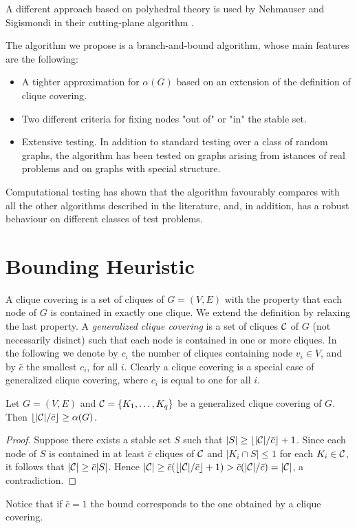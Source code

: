 A different approach based on polyhedral theory is used by Nehmauser
and Sigismondi in their cutting-plane algorithm  \cite{NeSi89}.

   The algorithm we propose is a branch-and-bound algorithm, whose
main features are the following: 

\begin{itemize}
\item A tighter  approximation for $\alpha(G)$ based on an extension
of the definition of clique covering. 
\item Two different criteria for fixing nodes "out of" or "in" the
stable set. 
 \item Extensive testing. In addition to standard testing over a
class  of random graphs, the algorithm has been tested on graphs 
arising from istances of real problems and on graphs with
special  structure. 
\end{itemize} 

Computational testing has shown that the algorithm favourably
compares with all the other algorithms described in the
literature, and, in addition, has a robust behaviour on different
classes of test problems. 



\section{Bounding Heuristic}
\label{Se-Bounding}

A  clique covering is a set of cliques of $G=(V,E)$ with
the property that each node of $G$ is contained in exactly one
clique. We extend the definition by relaxing the last property. 
 A {\it generalized clique covering} is a set of
cliques $\cal C$ of $G$ (not necessarily disinct) such that each
node is contained in one or more cliques. In the following we denote
by $c_i$ the number of cliques containing node $v_i \in V$, and by
$\bar c$ the smallest $c_i$, for all $i$. 
   Clearly a   clique covering is a special case of 
generalized clique covering, where $c_i$ is equal to one for all
$i$. 
 \begin{theorem}
  \label{th-c_bound}
Let $G=(V,E)$ and ${\cal C} = \{K_1,\dots,K_q\}$ be a generalized
clique covering of $G$.  Then $\lfloor {|\cal C|}/\bar c \rfloor
\geq \alpha(G)$. 
\end {theorem} 
\begin {proof} 
Suppose there exists a stable set $S$ such that $|S|
\geq \lfloor |{\cal C}|/\bar c \rfloor + 1$. Since each node of $S$
is contained in at least $\bar c$  cliques of $\cal C$ and $|K_i \cap
S| \leq 1$ for each $K_i \in {\cal C}$, it follows that $|{\cal C}|
\geq \bar c |S|$. Hence $|{\cal C}|\geq\bar c(\lfloor |{\cal C}| /
\bar c \rfloor + 1) > \bar c( |{\cal C}| / \bar c) = |{\cal C}|$, a
contradiction.    \end {proof}  Notice that if $\bar c = 1$ the
bound corresponds to the one obtained by a clique
covering.   

